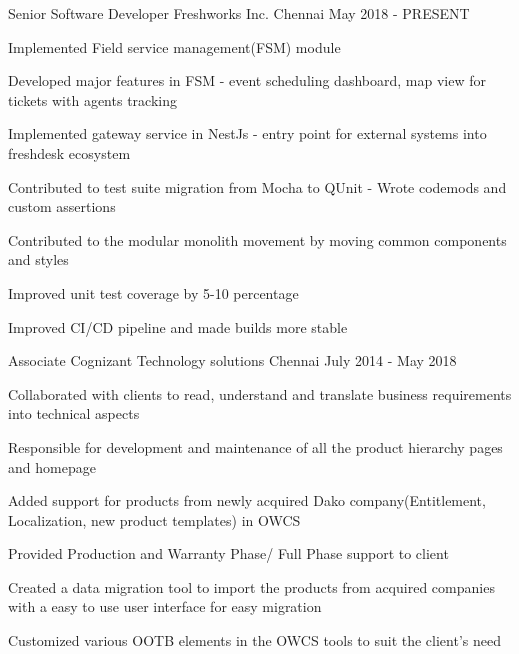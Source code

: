 
\begin{cventries}
  \cventry
    {Senior Software Developer} %
    {Freshworks Inc.} %
    {Chennai} %
    {May 2018 - PRESENT} %
    {
      \begin{cvitems} %
        \item {Implemented Field service management(FSM) module}
        \item {Developed major features in FSM - event scheduling dashboard, map view for tickets with agents tracking}
        \item {Implemented gateway service in NestJs - entry point for external systems into freshdesk ecosystem}
        \item {Contributed to test suite migration from Mocha to QUnit - Wrote codemods and custom assertions}
        \item {Contributed to the modular monolith movement by moving common components and styles}
        \item {Improved unit test coverage by 5-10 percentage}
        \item {Improved CI/CD pipeline and made builds more stable}
      \end{cvitems}
    }

  \cventry
    {Associate} %
    {Cognizant Technology solutions} %
    {Chennai} %
    {July 2014 - May 2018} %
    {
      \begin{cvitems} %
        \item {Collaborated with clients to read, understand and translate business requirements into technical aspects}
        \item {Responsible for development and maintenance of all the product hierarchy pages and homepage}
        \item {Added support for products from newly acquired Dako company(Entitlement, Localization, new product templates) in OWCS}
        \item {Provided Production and Warranty Phase/ Full Phase support to client}
        \item {Created a data migration tool to import the products from acquired companies with a easy to use user interface for easy migration }
        \item {Customized various OOTB elements in the OWCS tools to suit the client's need}
      \end{cvitems}
    }    
\end{cventries}

